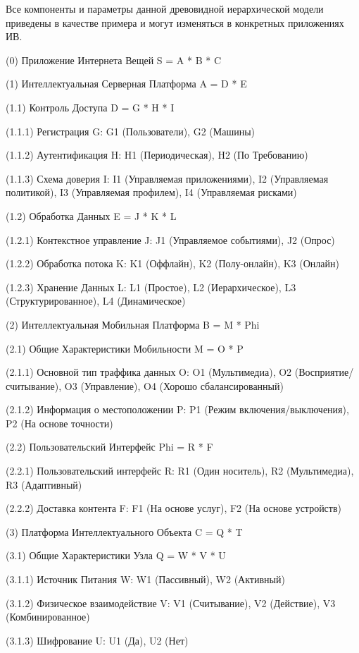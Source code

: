 Все компоненты и параметры данной древовидной иерархической модели приведены в качестве примера и могут изменяться в конкретных приложениях ИВ.

(0) Приложение Интернета Вещей S = A * B * C

(1) Интеллектуальная Серверная Платформа A = D * E

(1.1) Контроль Доступа D = G * H * I

    (1.1.1) Регистрация G: G1 (Пользователи), G2 (Машины)

    (1.1.2) Аутентификация H: H1 (Периодическая), H2 (По Требованию)

    (1.1.3) Схема доверия I: I1 (Управляемая приложениями), I2 (Управляемая политикой), I3 (Управляемая профилем), I4 (Управляемая рисками)

(1.2) Обработка Данных E = J * K * L

    (1.2.1) Контекстное управление J: J1 (Управляемое событиями), J2 (Опрос)

    (1.2.2) Обработка потока K: K1 (Оффлайн), K2 (Полу-онлайн), K3 (Онлайн)

    (1.2.3) Хранение Данных L: L1 (Простое), L2 (Иерархическое), L3 (Структурированное), L4 (Динамическое)

(2) Интеллектуальная Мобильная Платформа B = M * Phi

(2.1) Общие Характеристики Мобильности M = O * P

    (2.1.1) Основной тип траффика данных O: O1 (Мультимедиа), O2 (Восприятие/считывание), O3 (Управление), O4 (Хорошо сбалансированный)

    (2.1.2) Информация о местоположении P: P1 (Режим включения/выключения), P2 (На основе точности)

(2.2) Пользовательский Интерфейс Phi = R * F

    (2.2.1) Пользовательский интерфейс R: R1 (Один носитель), R2 (Мультимедиа), R3 (Адаптивный)

    (2.2.2) Доставка контента F: F1 (На основе услуг), F2 (На основе устройств)

(3) Платформа Интеллектуального Объекта C = Q * T

    (3.1) Общие Характеристики Узла Q = W * V * U

    (3.1.1) Источник Питания W: W1 (Пассивный), W2 (Активный)

    (3.1.2) Физическое взаимодействие V: V1 (Считывание), V2 (Действие), V3 (Комбинированное)

    (3.1.3) Шифрование U: U1 (Да), U2 (Нет)


